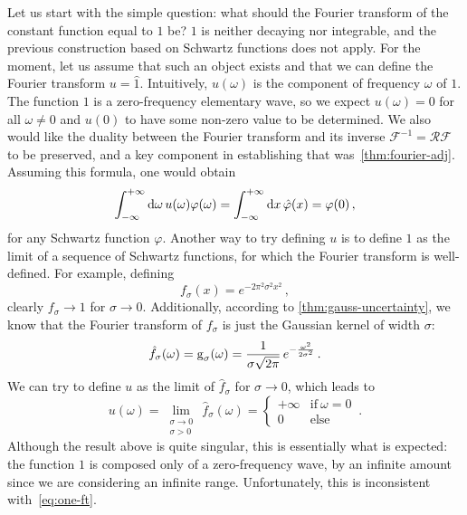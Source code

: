 Let us start with the simple question: what should the Fourier transform of the constant
function equal to $1$ be? $1$ is neither decaying nor integrable, and the previous
construction based on Schwartz functions does not apply. For the moment, let us assume
that such an object exists and that we can define the Fourier transform $u=\hat{1}$.
Intuitively, $u(\omega)$ is the component of frequency $\omega$ of $1$. The function $1$
is a zero-frequency elementary wave, so we expect $u(\omega)=0$ for all $\omega\neq 0$
and $u(0)$ to have some non-zero value to be determined. We also would like the duality
between the Fourier transform and its inverse $\mathcal{F}^{-1}=\mathcal{R}\mathcal{F}$
to be preserved, and a key component in establishing that was~\cref{thm:fourier-adj}.
Assuming this formula, one would obtain
\begin{equation}
	\int_{-\infty}^{+\infty}\mathrm{d}{\omega}\,u(\omega)\varphi(\omega)=\int_{-\infty}^{+\infty}\mathrm{d}{x}\,\hat{\varphi}(x)=\varphi(0)\,,
	\label{eq:one-ft}
\end{equation}
for any Schwartz function $\varphi$. Another way to try defining $u$ is to define $1$ as
the limit of a sequence of Schwartz functions, for which the Fourier transform is
well-defined. For example, defining
\begin{equation}
	f_{\sigma}(x)=e^{-2\pi^2\sigma^2 x^2}\,,
\end{equation}
clearly $f_\sigma\to 1$ for $\sigma\to 0$. Additionally, according to
\cref{thm:gauss-uncertainty}, we know that the Fourier transform of $f_{\sigma}$ is just
the Gaussian kernel of width $\sigma$:
\begin{equation}
	\hat{f}_{\sigma}(\omega)=\operatorname{g}_\sigma(\omega)=\frac{1}{\sigma\sqrt{2\pi}}\,
	e^{-\frac{\omega^2}{2\sigma^2}}\,.
\end{equation}
We can try to define $u$ as the limit of $\hat{f}_{\sigma}$ for $\sigma\to 0$, which leads
to
\begin{equation}
	u(\omega)=\lim_{\substack{\sigma\to 0\\\sigma>0}}\,\hat{f}_{\sigma}(\omega)=
	\begin{cases}
		+\infty & \text{if}~\omega=0 \\
		0       & \text{else}
	\end{cases}\,.
\end{equation}
Although the result above is quite singular, this is essentially what is expected: the
function $1$ is composed only of a zero-frequency wave, by an infinite amount since we are
considering an infinite range. Unfortunately, this is inconsistent with~\cref{eq:one-ft}.
